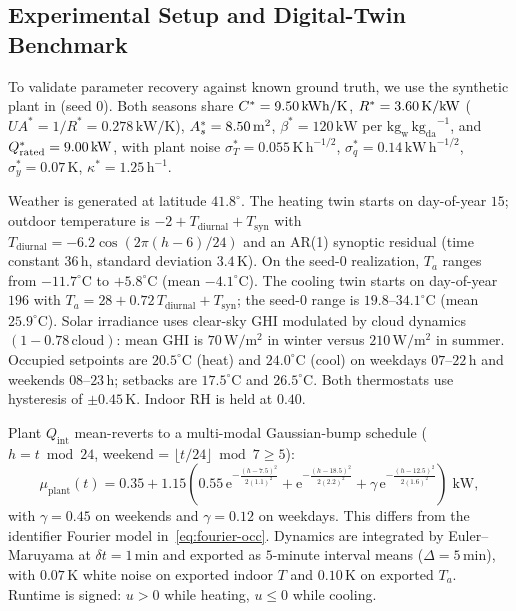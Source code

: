 \documentclass[11pt,letterpaper]{article}
\begin{document}
\subsection{Experimental Setup and Digital-Twin Benchmark}
\label{sec:results-setup}
To validate parameter recovery against known ground truth, we use the synthetic plant in  (seed $0$). Both seasons share $C^*=9.50\,\mathrm{kWh/K}$, $R^*=3.60\,\mathrm{K/kW}$ ($UA^*=1/R^*=0.278\,\mathrm{kW/K}$), $A_s^*=8.50\,\mathrm{m}^2$, $\beta^*=120\,\mathrm{kW}$ per $\mathrm{kg_w\,kg_{da}}^{-1}$, and $Q_\mathrm{rated}^*=9.00\,\mathrm{kW}$, with plant noise $\sigma_T^*=0.055\,\mathrm{K\,h}^{-1/2}$, $\sigma_q^*=0.14\,\mathrm{kW\,h}^{-1/2}$, $\sigma_y^*=0.07\,\mathrm{K}$, $\kappa^*=1.25\,\mathrm{h}^{-1}$.

Weather is generated at latitude $41.8^\circ$. The heating twin starts on day-of-year $15$; outdoor temperature is $-2+T_{\mathrm{diurnal}}+T_{\mathrm{syn}}$ with $T_{\mathrm{diurnal}}=-6.2\cos(2\pi(h-6)/24)$ and an AR(1) synoptic residual (time constant $36\,\mathrm{h}$, standard deviation $3.4\,\mathrm{K}$). On the seed-$0$ realization, $T_a$ ranges from $-11.7^\circ\mathrm{C}$ to $+5.8^\circ\mathrm{C}$ (mean $-4.1^\circ\mathrm{C}$). The cooling twin starts on day-of-year $196$ with $T_a=28+0.72\,T_{\mathrm{diurnal}}+T_{\mathrm{syn}}$; the seed-$0$ range is $19.8$--$34.1^\circ\mathrm{C}$ (mean $25.9^\circ\mathrm{C}$). Solar irradiance uses clear-sky GHI modulated by cloud dynamics $(1 - 0.78\,\mathrm{cloud})$: mean GHI is $70\,\mathrm{W/m^2}$ in winter versus $210\,\mathrm{W/m^2}$ in summer. Occupied setpoints are $20.5^\circ\mathrm{C}$ (heat) and $24.0^\circ\mathrm{C}$ (cool) on weekdays $07$--$22\,\mathrm{h}$ and weekends $08$--$23\,\mathrm{h}$; setbacks are $17.5^\circ\mathrm{C}$ and $26.5^\circ\mathrm{C}$. Both thermostats use hysteresis of $\pm 0.45\,\mathrm{K}$. Indoor RH is held at $0.40$.

Plant $Q_\mathrm{int}$ mean-reverts to a multi-modal Gaussian-bump schedule ($h=t\bmod 24$, weekend = $\lfloor t/24\rfloor\bmod 7\ge 5$):
\begin{equation}
\label{eq:plant-occ}
\mu_\mathrm{plant}(t) = 0.35 + 1.15\left( 0.55\,\mathrm{e}^{-\frac{(h-7.5)^2}{2(1.1)^2}} + \mathrm{e}^{-\frac{(h-18.5)^2}{2(2.2)^2}} + \gamma\,\mathrm{e}^{-\frac{(h-12.5)^2}{2(1.6)^2}} \right)\;\mathrm{kW},
\end{equation}
with $\gamma=0.45$ on weekends and $\gamma=0.12$ on weekdays. This differs from the identifier Fourier model in~\eqref{eq:fourier-occ}. Dynamics are integrated by Euler--Maruyama at $\delta t=1\,\mathrm{min}$ and exported as $5$-minute interval means ($\Delta=5\,\mathrm{min}$), with $0.07\,\mathrm{K}$ white noise on exported indoor $T$ and $0.10\,\mathrm{K}$ on exported $T_a$. Runtime is signed: $u>0$ while heating, $u\le 0$ while cooling.
\end{document}
